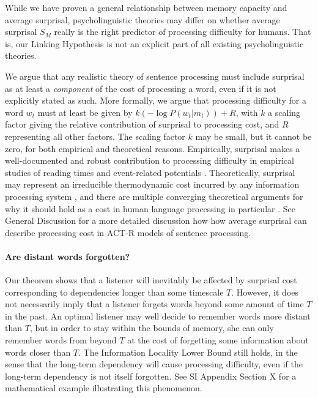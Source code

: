 While we have proven a general relationship between memory capacity and average surprisal, psycholinguistic theories may differ on whether average surprisal $S_M$ really is the right predictor of processing difficulty for humans. That is, our Linking Hypothesis is not an explicit part of all existing psycholinguistic theories.

We argue that any realistic theory of sentence processing must include surprisal as at least a \emph{component} of the cost of processing a word, even if it is not explicitly stated as such. More formally, we argue that processing difficulty for a word $w_t$ must at least be given by $k (-\log P(w_t |m_t)) + R$, with $k$ a scaling factor giving the relative contribution of surprisal to processing cost, and $R$ representing all other factors. The scaling factor $k$ may be small, but it cannot be zero, for both empirical and theoretical reasons. Empirically, surprisal makes a well-documented and robust contribution to processing difficulty in empirical studies of reading times and event-related potentials \citep{smith2013effect,frank2016erp}. Theoretically, surprisal may represent an irreducible thermodynamic cost incurred by any information processing system \citep{brillouin,still2012thermodynamic,zenon2019information}, and there are multiple converging theoretical arguments for why it should hold as a cost in human language processing in particular \citep{levy2013memory}. See General Discussion for a more detailed discussion how how average surprisal can describe processing cost in ACT-R models of sentence processing.

\paragraph{Are distant words forgotten?} Our theorem shows that a listener will inevitably be affected by surprisal cost corresponding to dependencies longer than some timescale $T$. However, it does not necessarily imply that a listener forgets words beyond some amount of time $T$ in the past. An optimal listener may well decide to remember words more distant than $T$, but in order to stay within the bounds of memory, she can only remember words from beyond $T$ at the cost of forgetting some information about words closer than $T$.
The Information Locality Lower Bound still holds, in the sense that the long-term dependency will cause processing difficulty, even if the long-term dependency is not itself forgotten.
See SI Appendix Section X for a mathematical example illustrating this phenomenon.

